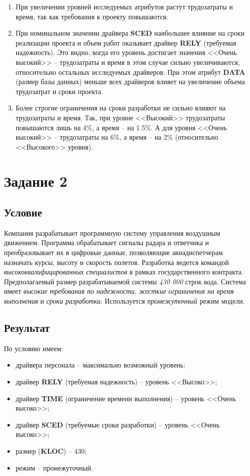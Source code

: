 \begin{enumerate}
    \item При увеличении уровней исследуемых атрибутов растут трудозатраты и время, так как требования к проекту повышаются.
    \item При номинальном значении драйвера \textbf{SCED} наибольшее влияние на сроки реализации проекта и объем работ оказывает драйвер \textbf{RELY} (требуемая надежность). Это видно, когда его уровень достигает значения <<Очень высокий>> -- трудозатраты и время в этом случае сильно увеличиваются, относительно остальных исследуемых драйверов. При этом атрибут \textbf{DATA} (размер базы данных) меньше всех драйверов влияет на увеличение объема трудозатрат и сроки проекта.
    \item Более строгие ограничения на сроки разработки не сильно влияют на трудозатраты и время. Так, при уровне <<Высокий>> трудозатраты повышаются лишь на 4\%, а время -- на 1.5\%. А для уровня <<Очень высокий>> -- трудозатраты на 6\%, а время -- на 2\% (относительно <<Высокого>> уровня).
\end{enumerate}


\section{Задание 2}

\subsection{Условие}

Компания разрабатывает программную систему управления воздушным движением. Программа обрабатывает сигналы радара и ответчика и преобразовывает их в цифровые данные, позволяющие авиадиспетчерам назначать курсы, высоту и скорость полетов. Разработка ведется командой \textit{высококвалифицированных специалистов} в рамках государственного контракта. Предполагаемый размер разрабатываемой системы \textit{430 000} строк кода. Система имеет \textit{высокие требования по надежности}, \textit{жесткие ограничения на время выполнения} и \textit{сроки разработки}. Используется \textit{промежуточный} режим модели.


\subsection{Результат}

По условию имеем:

\begin{itemize}
    \item драйвера персонала -- максимально возможный уровень;
    \item драйвер \textbf{RELY} (требуемая надежность) -- уровень <<Высоко>>;
    \item драйвер \textbf{TIME} (ограничение времени выполнения) -- уровень <<Очень высоко>>;
    \item драйвер \textbf{SCED} (требуемые сроки разработки) -- уровень <<Очень высоко>>;
    \item размер (\textbf{KLOC}) -- 430;
    \item режим -- промежуточный.
\end{itemize}

